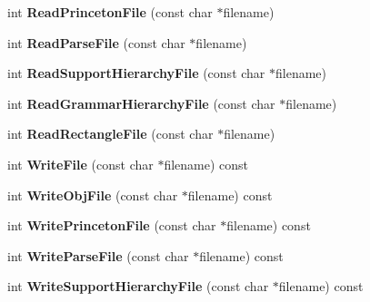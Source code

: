 \begin{DoxyCompactItemize}
\item 
int {\bfseries Read\+Princeton\+File} (const char $\ast$filename)\hypertarget{class_r3_scene_aef1a9ae118de0997b659657aac2f3083}{}\label{class_r3_scene_aef1a9ae118de0997b659657aac2f3083}

\item 
int {\bfseries Read\+Parse\+File} (const char $\ast$filename)\hypertarget{class_r3_scene_a6adfc92505c4f1847b38382bae21df9f}{}\label{class_r3_scene_a6adfc92505c4f1847b38382bae21df9f}

\item 
int {\bfseries Read\+Support\+Hierarchy\+File} (const char $\ast$filename)\hypertarget{class_r3_scene_a028248071ce50d532dc62a96f005eabb}{}\label{class_r3_scene_a028248071ce50d532dc62a96f005eabb}

\item 
int {\bfseries Read\+Grammar\+Hierarchy\+File} (const char $\ast$filename)\hypertarget{class_r3_scene_ab0ab30b22e4520fa8339d09b7555a1b1}{}\label{class_r3_scene_ab0ab30b22e4520fa8339d09b7555a1b1}

\item 
int {\bfseries Read\+Rectangle\+File} (const char $\ast$filename)\hypertarget{class_r3_scene_a562d067741b7aaf453a35a3df0d73011}{}\label{class_r3_scene_a562d067741b7aaf453a35a3df0d73011}

\item 
int {\bfseries Write\+File} (const char $\ast$filename) const \hypertarget{class_r3_scene_a210427bbe707895683b82a2482048b6c}{}\label{class_r3_scene_a210427bbe707895683b82a2482048b6c}

\item 
int {\bfseries Write\+Obj\+File} (const char $\ast$filename) const \hypertarget{class_r3_scene_a0a19ace90f62cc28a5a82eacc33ccef8}{}\label{class_r3_scene_a0a19ace90f62cc28a5a82eacc33ccef8}

\item 
int {\bfseries Write\+Princeton\+File} (const char $\ast$filename) const \hypertarget{class_r3_scene_a9d72ac32502a2c7d3d954076f4c563a0}{}\label{class_r3_scene_a9d72ac32502a2c7d3d954076f4c563a0}

\item 
int {\bfseries Write\+Parse\+File} (const char $\ast$filename) const \hypertarget{class_r3_scene_a6f75e394f687c8a1276867319729e09a}{}\label{class_r3_scene_a6f75e394f687c8a1276867319729e09a}

\item 
int {\bfseries Write\+Support\+Hierarchy\+File} (const char $\ast$filename) const \hypertarget{class_r3_scene_a7ae24b28a57af71e8765f125be0472b2}{}\label{class_r3_scene_a7ae24b28a57af71e8765f125be0472b2}


\end{DoxyCompactItemize}
